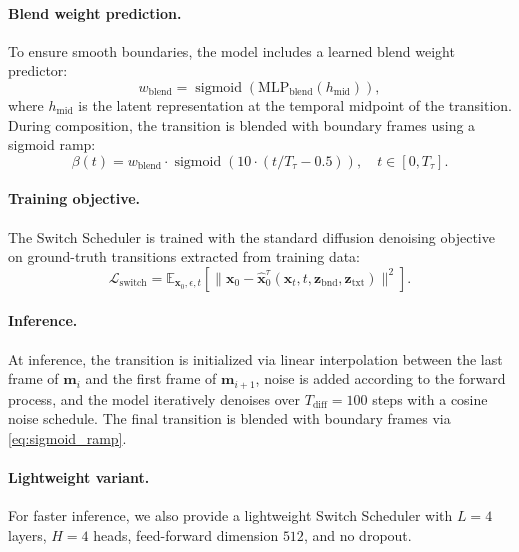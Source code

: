 \documentclass[runningheads]{llncs}
\DeclareMathOperator{\sigmoid}{sigmoid}
\newcommand{\bx}{\mathbf{x}}
\newcommand{\bz}{\mathbf{z}}
\newcommand{\bm}{\mathbf{m}}
\begin{document}
\paragraph{Blend weight prediction.}
To ensure smooth boundaries, the model includes a learned blend weight predictor:
\begin{equation}
    w_\text{blend} = \sigmoid\left(\text{MLP}_\text{blend}(h_{\text{mid}})\right),
    \label{eq:blend_weight}
\end{equation}
where $h_\text{mid}$ is the latent representation at the temporal midpoint of the transition.
During composition, the transition is blended with boundary frames using a sigmoid ramp:
\begin{equation}
    \beta(t) = w_\text{blend} \cdot \sigmoid\left(10 \cdot (t / T_\tau - 0.5)\right), \quad t \in [0, T_\tau].
    \label{eq:sigmoid_ramp}
\end{equation}

\paragraph{Training objective.}
The Switch Scheduler is trained with the standard diffusion denoising objective on ground-truth transitions extracted from training data:
\begin{equation}
    \mathcal{L}_\text{switch} = \mathbb{E}_{\bx_0, \epsilon, t}\left[\| \bx_0 - \hat{\bx}_0^\tau(\bx_t, t, \bz_\text{bnd}, \bz_\text{txt}) \|^2\right].
    \label{eq:switch_loss}
\end{equation}

\paragraph{Inference.}
At inference, the transition is initialized via linear interpolation between the last frame of $\bm_i$ and the first frame of $\bm_{i{+}1}$, noise is added according to the forward process, and the model iteratively denoises over $T_\text{diff} = 100$ steps with a cosine noise schedule.
The final transition is blended with boundary frames via \cref{eq:sigmoid_ramp}.

\paragraph{Lightweight variant.}
For faster inference, we also provide a lightweight Switch Scheduler with $L{=}4$ layers, $H{=}4$ heads, feed-forward dimension $512$, and no dropout.
\end{document}
